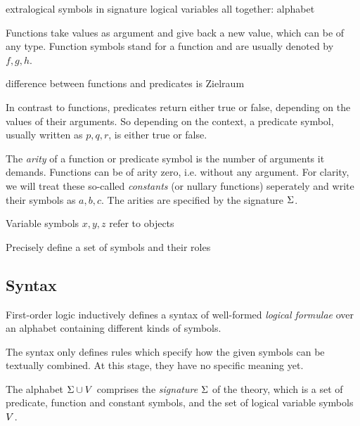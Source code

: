        extralogical symbols in signature
        logical variables
        all together: alphabet

        Functions take values as argument and give back a new value, which can be of any type. Function symbols stand for a function and are usually denoted by $f,g,h$.

        difference between functions and predicates is Zielraum

        In contrast to functions, predicates return either true or false, depending on the values of their arguments.
        So depending on the context, a predicate symbol, usually written as $p,q,r$, is either true or false.

        The \textit{arity} of a function or predicate symbol is the number of arguments it demands.
        Functions can be of arity zero, i.e. without any argument.
        For clarity, we will treat these so-called \textit{constants} (or nullary functions) seperately and write their symbols as $a,b,c$.
        The arities are specified by the signature $\Sigma$.

        Variable symbols $x,y,z$ refer to objects

        Precisely define a set of symbols and their roles

        \subsection{Syntax}
            \label{sec:FOL-syntax}

            First-order logic inductively defines a syntax of well-formed \textit{logical formulae} over an alphabet containing different kinds of symbols.

            The syntax only defines rules which specify how the given symbols can be textually combined. At this stage, they have no specific meaning yet.

            The alphabet $\Sigma\cup V$ comprises the \textit{signature} $\Sigma$ of the theory, which is a set of predicate, function and constant symbols, and the set of logical variable symbols $V$.

